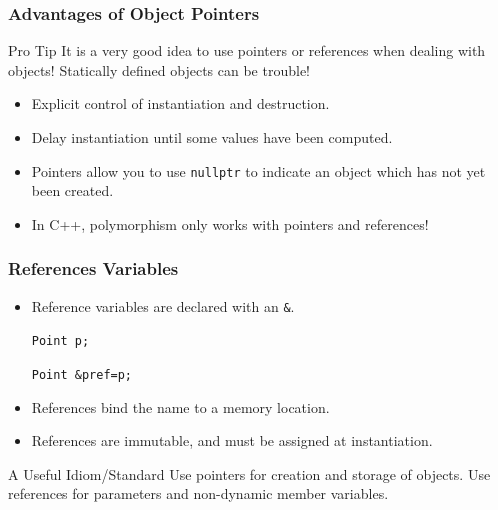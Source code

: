 \documentclass{beamer}
\begin{document}
\begin{frame}
    \frametitle{Advantages of Object Pointers}
    \begin{block}{Pro Tip}
        It is a very good idea to use pointers or references when
        dealing with objects!  Statically defined objects can be 
        trouble!
    \end{block}
    \begin{itemize}
        \item Explicit control of instantiation and destruction.
        \item Delay instantiation until some values have been computed.
        \item Pointers allow you to use {\tt nullptr} to indicate an
            object which has not yet been created.
        \item In C++, polymorphism only works with pointers and references!
    \end{itemize}
\end{frame}

\begin{frame}
    \frametitle{References Variables}
    \begin{itemize}
        \item Reference variables are declared with an {\tt \&}.
            \par{\tt Point p;}
            \par{\tt Point \&pref=p;}
        \item References bind the name to a memory location.
        \item References are immutable, and must be assigned at 
            instantiation.
    \end{itemize}
    \begin{block}{A Useful Idiom/Standard}
        Use pointers for creation and storage of objects.  Use
        references for parameters and non-dynamic member variables.
    \end{block}
\end{frame}
\end{document}
